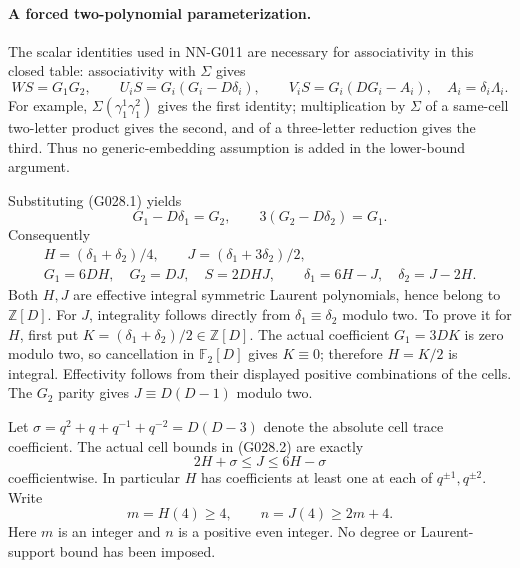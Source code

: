 \paragraph{A forced two-polynomial parameterization.}
The scalar identities used in NN-G011 are necessary
for associativity in this closed table: associativity
with $\Sigma$ gives
\[
 WS=G_1G_2,\qquad U_iS=G_i(G_i-D\delta_i),\qquad
 V_iS=G_i(DG_i-A_i),\quad A_i=\delta_i\Lambda_i.
\]
For example, $\Sigma(\gamma_1^1\gamma_1^2)$ gives
the first identity; multiplication by $\Sigma$ of
a same-cell two-letter product gives the second,
and of a three-letter reduction gives the third.
Thus no generic-embedding assumption is added in
the lower-bound argument.

Substituting (G028.1) yields
\[
 G_1-D\delta_1=G_2,\qquad
 3(G_2-D\delta_2)=G_1.
\]
Consequently
\[
 \begin{gathered}
 H=(\delta_1+\delta_2)/4,\qquad
 J=(\delta_1+3\delta_2)/2,\\
 G_1=6DH,\quad G_2=DJ,\quad S=2DHJ,\qquad
 \delta_1=6H-J,\quad\delta_2=J-2H.                 \end{gathered}\tag{G028.2}
\]
Both $H,J$ are effective integral symmetric Laurent
polynomials, hence belong to $\mathbb Z[D]$.
For $J$, integrality follows directly from
$\delta_1\equiv\delta_2$ modulo two. To prove it for
$H$, first put $K=(\delta_1+\delta_2)/2\in\mathbb Z[D]$.
The actual coefficient $G_1=3DK$ is zero modulo two,
so cancellation in $\mathbb F_2[D]$ gives $K\equiv0$;
therefore $H=K/2$ is integral. Effectivity follows
from their displayed positive combinations of the cells.
The $G_2$ parity gives $J\equiv D(D-1)$ modulo two.

Let $\sigma=q^2+q+q^{-1}+q^{-2}=D(D-3)$ denote
the absolute cell trace coefficient. The actual cell
bounds in (G028.2) are exactly
\[
 2H+\sigma\le J\le6H-\sigma                       \tag{G028.3}
\]
coefficientwise. In particular $H$ has coefficients
at least one at each of $q^{\pm1},q^{\pm2}$.
Write
\[
 m=H(4)\ge4,\qquad n=J(4)\ge2m+4.
\]
Here $m$ is an integer and $n$ is a positive even integer.
No degree or Laurent-support bound has been imposed.


